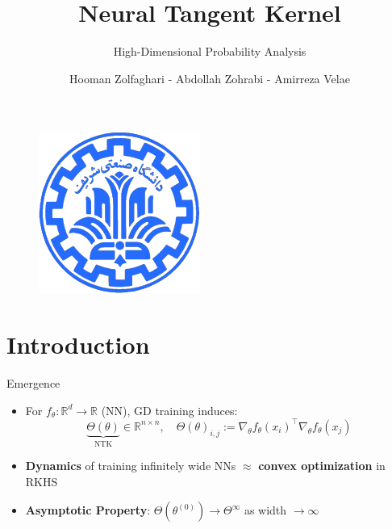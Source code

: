 \documentclass[serif, aspectratio=169]{beamer}
\author{Hooman Zolfaghari - Abdollah Zohrabi - Amirreza Velae}
\title{Neural Tangent Kernel}
\subtitle{High-Dimensional Probability Analysis}
\institute{
    Sharif University of Technology
}
\begin{document}
\begin{frame}
    \titlepage
    \vspace*{-0.6cm}
    \begin{figure}[htpb]
        \begin{center}
            \includegraphics[keepaspectratio, scale=0.25]{pic/sharif-main-logo.png}
        \end{center}
    \end{figure}
\end{frame}

\begin{frame}    
\tableofcontents[sectionstyle=show,
subsectionstyle=show/shaded/hide,
subsubsectionstyle=show/shaded/hide]
\end{frame}

\section{Introduction}

\begin{frame}{Emergence}
	\begin{itemize}
		
		\item For \(f_\theta: \mathbb{R}^d \to \mathbb{R}\) (NN), GD training induces:
		\[
		\underbrace{\Theta(\theta)}_{\text{NTK}} \in \mathbb{R}^{n\times n}, \quad \Theta(\theta)_{i,j}:= \nabla_\theta f_\theta(x_i)^\top \nabla_\theta f_\theta(x_j) 
		\]
		
		\item \textbf{Dynamics} of training infinitely wide NNs \(\approx\) \textbf{convex optimization} in RKHS
		
		
		\item \textbf{Asymptotic Property}: \(\Theta(\theta^{(0)}) \to \Theta^{\infty}\) as width \(\to \infty\)
		
	\end{itemize}
	
\end{frame}
\end{document}
